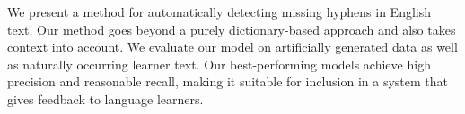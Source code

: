 We present a method for automatically detecting missing hyphens in English text. Our method goes beyond a purely dictionary-based approach and also takes
 context into account. We evaluate our model on artificially generated data as
 well as naturally occurring learner text. Our best-performing models achieve
 high precision and reasonable recall, making it suitable for inclusion in a
 system that gives feedback to language learners.

